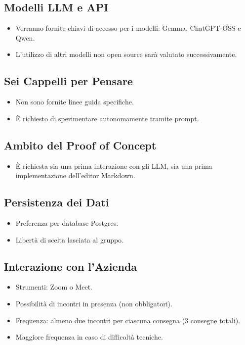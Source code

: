 \subsection{Modelli LLM e API}
\begin{itemize}
	\item Verranno fornite chiavi di accesso per i modelli: Gemma, ChatGPT-OSS e Qwen.
	\item L’utilizzo di altri modelli non open source sarà valutato successivamente.
\end{itemize}

\subsection{Sei Cappelli per Pensare}
\begin{itemize}
	\item Non sono fornite linee guida specifiche.
	\item È richiesto di sperimentare autonomamente tramite prompt.
\end{itemize}

\subsection{Ambito del Proof of Concept}
\begin{itemize}
	\item È richiesta sia una prima interazione con gli LLM, sia una prima implementazione dell’editor Markdown.
\end{itemize}

\subsection{Persistenza dei Dati}
\begin{itemize}
	\item Preferenza per database Postgres.
	\item Libertà di scelta lasciata al gruppo.
\end{itemize}

\subsection{Interazione con l'Azienda}
\begin{itemize}
	\item Strumenti: Zoom o Meet.
	\item Possibilità di incontri in presenza (non obbligatori).
	\item Frequenza: almeno due incontri per ciascuna consegna (3 consegne totali).
	\item Maggiore frequenza in caso di difficoltà tecniche.
\end{itemize}


